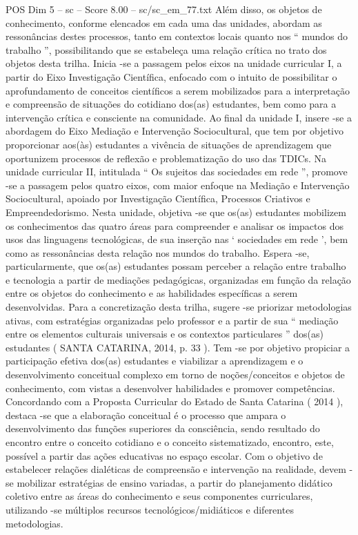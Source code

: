 \begin{textsample}{POS Dim 5 – sc – Score 8.00 – sc/sc\_em\_77.txt}
Além disso, os objetos de conhecimento, conforme elencados em cada uma das unidades, abordam as ressonâncias destes processos, tanto em contextos locais quanto nos “ mundos do trabalho ”, possibilitando que se estabeleça uma relação crítica no trato dos objetos desta trilha.
Inicia -se a passagem pelos eixos na unidade curricular I, a partir do Eixo Investigação Científica, enfocado com o intuito de possibilitar o aprofundamento de conceitos científicos a serem mobilizados para a interpretação e compreensão de situações do cotidiano dos(as) estudantes, bem como para a intervenção crítica e consciente na comunidade.
Ao final da unidade I, insere -se a abordagem do Eixo Mediação e Intervenção Sociocultural, que tem por objetivo proporcionar aos(às) estudantes a vivência de situações de aprendizagem que oportunizem processos de reflexão e problematização do uso das TDICs.
Na unidade curricular II, intitulada “ Os sujeitos das sociedades em rede ”, promove -se a passagem pelos quatro eixos, com maior enfoque na Mediação e Intervenção Sociocultural, apoiado por Investigação Científica, Processos Criativos e Empreendedorismo.
Nesta unidade, objetiva -se que os(as) estudantes mobilizem os conhecimentos das quatro áreas para compreender e analisar os impactos dos usos das linguagens tecnológicas, de sua inserção nas ‘ sociedades em rede ’, bem como as ressonâncias desta relação nos mundos do trabalho.
Espera -se, particularmente, que os(as) estudantes possam perceber a relação entre trabalho e tecnologia a partir de mediações pedagógicas, organizadas em função da relação entre os objetos do conhecimento e as habilidades específicas a serem desenvolvidas.
Para a concretização desta trilha, sugere -se priorizar metodologias ativas, com estratégias organizadas pelo professor e a partir de sua “ mediação entre os elementos culturais universais e os contextos particulares ” dos(as) estudantes ( SANTA CATARINA, 2014, p. 33 ).
Tem -se por objetivo propiciar a participação efetiva dos(as) estudantes e viabilizar a aprendizagem e o desenvolvimento conceitual complexo em torno de noções/conceitos e objetos de conhecimento, com vistas a desenvolver habilidades e promover competências.
Concordando com a Proposta Curricular do Estado de Santa Catarina ( 2014 ), destaca -se que a elaboração conceitual é o processo que ampara o desenvolvimento das funções superiores da consciência, sendo resultado do encontro entre o conceito cotidiano e o conceito sistematizado, encontro, este, possível a partir das ações educativas no espaço escolar.
Com o objetivo de estabelecer relações dialéticas de compreensão e intervenção na realidade, devem -se mobilizar estratégias de ensino variadas, a partir do planejamento didático coletivo entre as áreas do conhecimento e seus componentes curriculares, utilizando -se múltiplos recursos tecnológicos/midiáticos e diferentes metodologias.

\end{textsample}
